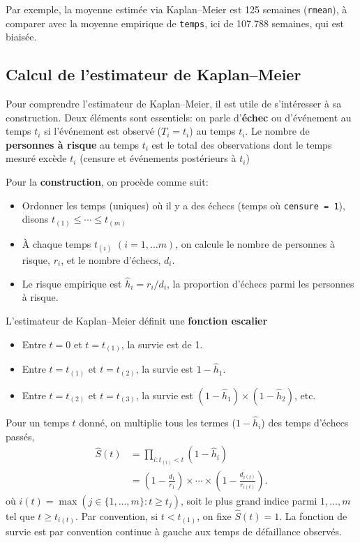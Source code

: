 \documentclass[
  11pt,
  letterpaper,
]{scrbook}
\providecommand{\tightlist}{%
  \setlength{\itemsep}{0pt}\setlength{\parskip}{0pt}}\usepackage{longtable,booktabs,array}
\theoremstyle{definition}
\theoremstyle{remark}
\begin{document}
Par exemple, la moyenne estimée via Kaplan--Meier est 125 semaines
(\texttt{rmean}), à comparer avec la moyenne empirique de
\texttt{temps}, ici de 107.788 semaines, qui est biaisée.

\subsection{Calcul de l'estimateur de
Kaplan--Meier}\label{calcul-de-lestimateur-de-kaplanmeier}

Pour comprendre l'estimateur de Kaplan--Meier, il est utile de
s'intéresser à sa construction. Deux éléments sont essentiels: on parle
d'\textbf{échec} ou d'événement au temps \(t_i\) si l'événement est
observé (\(T_i=t_i\)) au temps \(t_i\). Le nombre de \textbf{personnes à
risque} au temps \(t_i\) est le total des observations dont le temps
mesuré excède \(t_i\) (censure et événements postérieurs à \(t_i\))

Pour la \textbf{construction}, on procède comme suit:

\begin{itemize}
\tightlist
\item
  Ordonner les temps (uniques) où il y a des échecs (temps où
  \texttt{censure\ =\ 1}), disons \(t_{(1)} \leq \cdots \leq t_{(m)}\)
\item
  À chaque temps \(t_{(i)}\) \((i=1, \ldots m)\), on calcule le nombre
  de personnes à risque, \(r_i\), et le nombre d'échecs, \(d_i\).
\item
  Le risque empirique est \(\widehat{h}_i = r_i/d_i\), la proportion
  d'échecs parmi les personnes à risque.
\end{itemize}

L'estimateur de Kaplan--Meier définit une \textbf{fonction escalier}

\begin{itemize}
\tightlist
\item
  Entre \(t=0\) et \(t=t_{(1)}\), la survie est de 1.
\item
  Entre \(t=t_{(1)}\) et \(t=t_{(2)}\), la survie est
  \(1-\widehat{h}_1\).
\item
  Entre \(t=t_{(2)}\) et \(t=t_{(3)}\), la survie est
  \((1-\widehat{h}_1) \times (1-\widehat{h}_2)\), etc.
\end{itemize}

Pour un temps \(t\) donné, on multiplie tous les termes
(\(1-\widehat{h}_i\)) des temps d'échecs passés, \begin{align*}
 \widehat{S}(t) &= \prod_{i: t_{(i)} < t} \left( 1- \widehat{h}_i\right) \\ &= \left( 1- \frac{d_1}{r_1}\right) \times \cdots \times \left( 1- \frac{d_{i(t)}}{r_{i(t)}}\right).
\end{align*} où \(i(t) =\max(j \in \{1, \ldots, m\}:  t \geq t_{j})\),
soit le plus grand indice parmi \(1, \ldots, m\) tel que
\(t \geq t_{i(t)}\). Par convention, si \(t < t_{(1)}\), on fixe
\(\widehat{S}(t)=1\). La fonction de survie est par convention continue
à gauche aux temps de défaillance observés.
\end{document}
